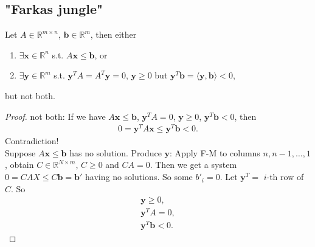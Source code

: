 \documentclass[a4paper,12pt]{amsart}
\newcommand{\RR}{\mathbb{R}}
\newcommand{\bfx}{\mathbf{x}}
\newcommand{\bfy}{\mathbf{y}}
\newcommand{\bfb}{\mathbf{b}}
\begin{document}
\subsection{"Farkas jungle"}
\begin{Corollary}
\label{cor02_01}
Let $A\in\RR^{m\times n}$, $\bfb\in\RR^{m}$, then either
\begin{enumerate}
\item $\exists \bfx\in\RR^n$ s.t. $A\bfx\leq \bfb$, or
\item $\exists \bfy\in\RR^m$ s.t. $\bfy^TA=A^T\bfy=0$, $\bfy\geq 0$ but $\bfy^T\bfb=\langle\bfy,\bfb\rangle<0$,
\end{enumerate}
but not both.
\end{Corollary}
\begin{proof}
not both: If we have $A\bfx\leq \bfb$, $\bfy^TA=0$, $\bfy\geq 0$, $\bfy^T\bfb<0$, then
\begin{align*}
0=\bfy^TA\bfx\leq \bfy^T\bfb<0.
\end{align*}
Contradiction!\\
Suppose $A\bfx\leq \bfb$ has no solution. Produce $\bfy$:
Apply F-M to columns $n,n-1,\dots,1$, obtain $C\in\RR^{N\times m}$, $C\geq 0$ and $CA=0$.
Then we get a system $0=CAX\leq C\bfb=\bfb'$ having no solutions.
So some $b'_i=0$. Let $\bfy^T=$ $i$-th row of $C$. So
\begin{align*}
\bfy\geq 0,\\\bfy^TA=0,\\\bfy^T\bfb<0.
\end{align*}
\end{proof}
\end{document}

